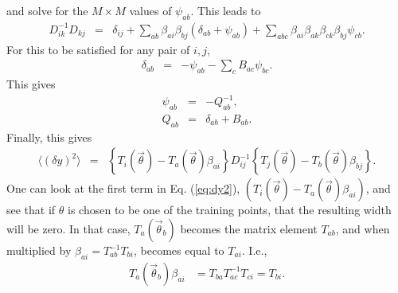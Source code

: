 \documentclass[UserManual.tex]{subfiles}
\begin{document}
and solve for the $M\times M$ values of $\psi_{ab}$. This leads to
\begin{eqnarray}
D^{-1}_{ik}D_{kj}&=&
\delta_{ij}+\sum_{ab}\beta_{ai}\beta_{bj}(\delta_{ab}+\psi_{ab})+\sum_{abc}\beta_{ai}\beta_{ak}\beta_{ck}\beta_{bj}\psi_{cb}.
\end{eqnarray}
For this to be satisfied for any pair of $i,j$,
\begin{eqnarray}
\delta_{ab}&=&-\psi_{ab}-\sum_cB_{ac}\psi_{bc}.
\end{eqnarray}
This gives
\begin{eqnarray}
\psi_{ab}&=&-Q^{-1}_{ab},\\
\nonumber
Q_{ab}&=&\delta_{ab}+B_{ab}.
\end{eqnarray}
Finally, this gives
\begin{eqnarray}\label{eq:dy2}
\langle(\delta y)^2\rangle&=&
\left\{T_i(\vec{\theta})-T_{a}(\vec{\theta})\beta_{ai}\right\}D^{-1}_{ij}
\left\{T_j(\vec{\theta})-T_b(\vec{\theta})\beta_{bj}\right\}.
\end{eqnarray}
One can look at the first term in Eq. (\ref{eq:dy2}), $(T_i(\vec{\theta})-T_{a}(\vec{\theta})\beta_{ai})$, and see that if $\theta$ is chosen to be one of the training points, that the resulting width will be zero. In that case, $T_{a}(\vec{\theta}_b)$ becomes the matrix element $T_{ab}$, and when multiplied by $\beta_{ai}=T^{-1}_{ab}T_{bi}$, becomes equal to $T_{ai}$. I.e.,
\begin{eqnarray}
T_a(\vec{\theta}_b)\beta_{ai}&=T_{ba}T^{-1}_{ac}T_{ci}=T_{bi}.
\end{eqnarray}
\end{document}
